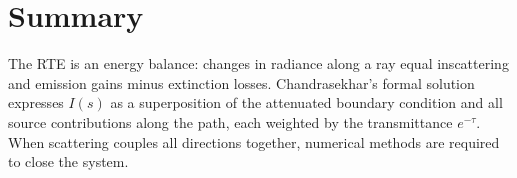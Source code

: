 \documentclass[11pt]{article}
\begin{document}
\section{Summary}

The RTE is an energy balance: changes in radiance along a ray equal inscattering and
emission gains minus extinction losses. Chandrasekhar's formal solution expresses $I(s)$ as a
superposition of the attenuated boundary condition and all source contributions along the
path, each weighted by the transmittance $e^{-\tau}$. When scattering couples all directions
together, numerical methods are required to close the system.
\end{document}
